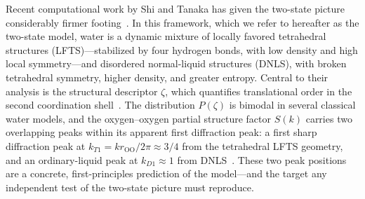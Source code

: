 
Recent computational work by Shi and Tanaka has given the two-state picture considerably firmer footing~\cite{shi_direct_2020,russo_understanding_2014,shi_microscopic_2018}. In this framework, which we refer to hereafter as the two-state model, water is a dynamic mixture of locally favored tetrahedral structures (LFTS)---stabilized by four hydrogen bonds, with low density and high local symmetry---and disordered normal-liquid structures (DNLS), with broken tetrahedral symmetry, higher density, and greater entropy. Central to their analysis is the
structural descriptor $\zeta$, which quantifies translational order in the second coordination shell~\cite{russo_understanding_2014}. The distribution $P(\zeta)$ is bimodal in several classical water models, and the
oxygen--oxygen partial structure factor $S(k)$ carries two overlapping peaks within its apparent first diffraction peak: a first sharp diffraction peak at $k_{T1} = k r_{\mathrm{OO}}/2\pi \approx 3/4$ from the tetrahedral
LFTS geometry, and an ordinary-liquid peak at $k_{D1} \approx 1$ from DNLS~\cite{shi_direct_2020,shi-2019}. These two peak positions are a concrete, first-principles prediction of the model---and the target any independent
test of the two-state picture must reproduce. 

